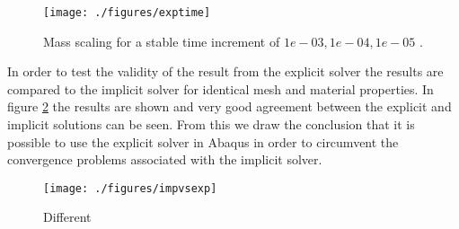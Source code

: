 \documentclass[grain_boundary_law.tex]{subfiles}
\begin{document}
\begin{figure}[htpb!]
\centering
\texttt{[image: ./figures/exptime]}
\caption{Mass scaling for a stable time increment of $1e-03,1e-04,1e-05$ .}
\label{fig:mass_scale}
\end{figure}

In order to test the validity of the result from the explicit solver the results are compared to the implicit solver for identical mesh and material properties. In figure \ref{fig:impvsexp} the results are shown and very good agreement between the explicit and implicit solutions can be seen. From this we draw the conclusion that it is possible to use the explicit solver in Abaqus in order to circumvent the convergence problems associated with the implicit solver.

\begin{figure}[htpb!]
\centering
\texttt{[image: ./figures/impvsexp]}
\caption{Different}
\label{fig:impvsexp}
\end{figure}
\end{document}
